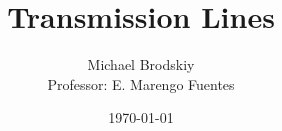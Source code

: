 


\title{Transmission Lines}
\date{\today}
\author{Michael Brodskiy\\ \small Professor: E. Marengo Fuentes}



\maketitle

